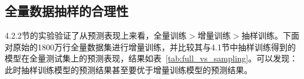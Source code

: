     \subsection{全量数据抽样的合理性}
    4.2.2节的实验验证了从预测表现上来看，全量训练$>$增量训练$>$抽样训练。下面对原始的1800万行全量数据集进行增量训练，并比较其与4.1节中抽样训练得到的模型在全量测试集上的预测表现，结果如表~\ref{tab:full_vs_sampling}。可以发现：此时抽样训练模型的预测结果甚至要优于增量训练模型的预测结果。
    \begin{table}[htbp]
      \centering
      \caption{全量数据的增量结果与$5\%$抽样的对比}
      \label{tab:full_vs_sampling}%
    \end{table}%

